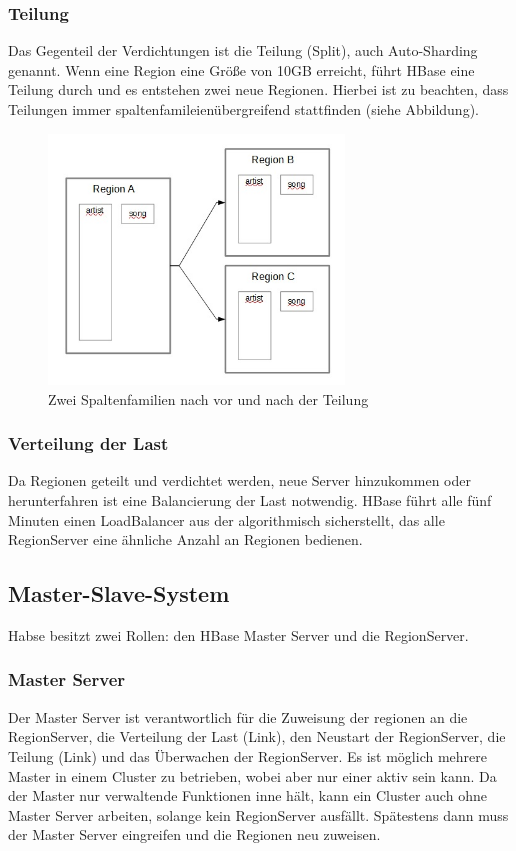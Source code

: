 \subsubsection{Teilung}
Das Gegenteil der Verdichtungen ist die Teilung (Split), auch Auto-Sharding genannt. Wenn eine Region eine Größe von 10GB erreicht, führt HBase eine Teilung durch und es entstehen zwei neue Regionen. Hierbei ist zu beachten, dass Teilungen immer spaltenfamileienübergreifend stattfinden (siehe Abbildung).

\begin{figure}[htbp] 
  \centering
     \includegraphics[width=0.7\textwidth]{images/split.jpg}
  \caption{Zwei Spaltenfamilien nach vor und nach der Teilung}
  \label{fig:Teilung}
\end{figure}


\subsubsection{Verteilung der Last}
Da Regionen geteilt und verdichtet werden, neue Server hinzukommen oder herunterfahren ist eine Balancierung der Last notwendig. HBase führt alle fünf Minuten einen LoadBalancer aus der algorithmisch sicherstellt, das alle RegionServer eine ähnliche Anzahl an Regionen bedienen. 

\subsection{Master-Slave-System}
Habse besitzt zwei Rollen: den HBase Master Server und die RegionServer.

\subsubsection{Master Server}
Der Master Server ist verantwortlich für die Zuweisung der regionen an die RegionServer, die Verteilung der Last (Link), den Neustart der RegionServer, die Teilung (Link) und das Überwachen der RegionServer. Es ist möglich mehrere Master in einem Cluster zu betrieben, wobei aber nur einer aktiv sein kann. Da der Master nur verwaltende Funktionen inne hält, kann ein Cluster auch ohne Master Server arbeiten, solange kein RegionServer ausfällt. Spätestens dann muss der Master Server eingreifen und die Regionen neu zuweisen.


